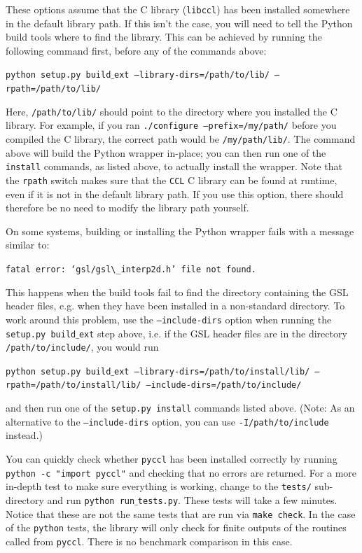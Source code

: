 \documentclass[\docopts]{\docclass}
\newcommand{\ccl}{{\tt CCL}\xspace}
\begin{document}
These options assume that the C library ({\tt libccl}) has been installed somewhere in the default library path. If this isn't the case, you will need to tell the Python build tools where to find the library. This can be achieved by running the following command first, before any of the commands above:

\texttt{python setup.py build$\_$ext --library-dirs=/path/to/lib/ --rpath=/path/to/lib/}

Here, {\tt /path/to/lib/} should point to the directory where you installed the C library. For example, if you ran {\tt ./configure --prefix=/my/path/} before you compiled the C library, the correct path would be {\tt /my/path/lib/}. The command above will build the Python wrapper in-place; you can then run one of the {\tt install} commands, as listed above, to actually install the wrapper. Note that the {\tt rpath} switch makes sure that the \ccl C library can be found at runtime, even if it is not in the default library path. If you use this option, there should therefore be no need to modify the library path yourself.

On some systems, building or installing the Python wrapper fails with a message similar to:

\texttt{fatal error: `gsl/gsl$\_$interp2d.h' file not found.}

This happens when the build tools fail to find the directory containing the GSL header files, e.g. when they have been installed in a non-standard directory. To work around this problem, use the {\tt --include-dirs} option when running the {\tt setup.py build$\_$ext} step above, i.e. if the GSL header files are in the directory {\tt /path/to/include/}, you would run

\texttt{python setup.py build$\_$ext --library-dirs=/path/to/install/lib/ --rpath=/path/to/install/lib/ --include-dirs=/path/to/include/}

and then run one of the {\tt setup.py install} commands listed above. (Note: As an alternative to the {\tt --include-dirs} option, you can use {\tt -I/path/to/include} instead.)

You can quickly check whether {\tt pyccl} has been installed correctly by running {\tt python -c "import pyccl"} and checking that no errors are returned. For a more in-depth test to make sure everything is working, change to the {\tt tests/} sub-directory and run {\tt python run$\_$tests.py}. These tests will take a few minutes. Notice that these are not the same tests that are run via {\tt make check}. In the case of the {\tt python} tests, the library will only check for finite outputs of the routines called from {\tt pyccl}. There is no benchmark comparison in this case.
\end{document}
